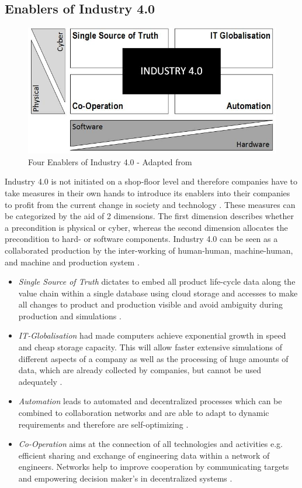\subsection{Enablers of Industry 4.0}
\begin{figure}[h!]
\includegraphics[scale=0.6]{./gfx/indus4enablers}
\centering
\caption{Four Enablers of Industry 4.0 - Adapted from \cite{IN4HYPO}}
\label{fig:2.1}
\end{figure}
Industry 4.0 is not initiated on a shop-floor level and therefore companies have to take measures in their own hands to introduce its enablers into their companies to profit from the current change in society and technology \cite{VDINACH}. 
These measures can be categorized by the aid of 2 dimensions. The first dimension describes whether a precondition is physical or cyber, whereas the second dimension allocates the precondition to hard- or software components. Industry 4.0 can be seen as a collaborated production by the inter-working of human-human, machine-human, and machine and production system  \cite{IN4HYPO}.
\begin{itemize}
\item \textit{Single Source of Truth} dictates to embed all product life-cycle data along the value chain within a single database using cloud storage and accesses to make all changes to product and production visible and avoid ambiguity during production and simulations \cite{IN4HYPO}.
\item \textit{\acs{IT}-Globalisation} had made computers achieve exponential growth in speed and cheap storage capacity. This will allow faster extensive simulations of different aspects of a company as well as the processing of huge amounts of data, which are already collected by companies, but cannot be used adequately \cite{IN4HYPO}.
\item \textit{Automation} leads to automated and decentralized processes which can be combined to collaboration networks and are able to adapt to dynamic requirements and therefore are self-optimizing \cite{IN4HYPO}.
\item \textit{Co-Operation} aims at the connection of all technologies and activities e.g. efficient sharing and exchange of engineering data within a
network of engineers. Networks help to improve cooperation by communicating targets and empowering decision maker’s in decentralized systems \cite{IN4HYPO,VDINACH}.
\end{itemize}
